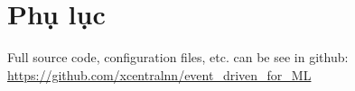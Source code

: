 \section*{Phụ lục}
Full source code, configuration files, etc. can be see in github: \url{https://github.com/xcentralnn/event_driven_for_ML}